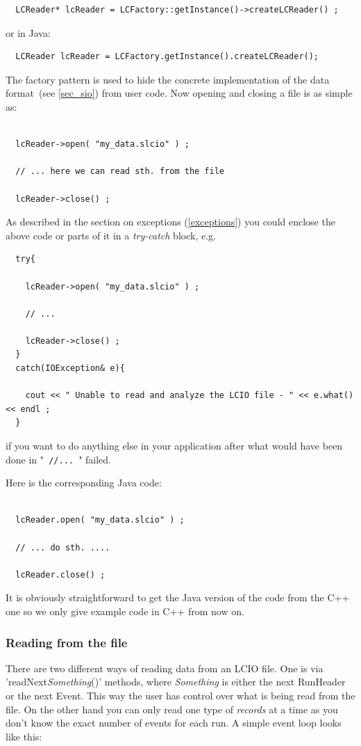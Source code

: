 \documentclass[twoside]{article}
\begin{document}
\begin{verbatim}
  LCReader* lcReader = LCFactory::getInstance()->createLCReader() ;
\end{verbatim}
or in Java:
\begin{verbatim}
  LCReader lcReader = LCFactory.getInstance().createLCReader();
\end{verbatim}

The factory pattern is used to hide  the concrete implementation of the data 
format~(see \ref{sec_sio}) from user code.
Now opening and closing a file is as simple as:
\begin{verbatim}

  lcReader->open( "my_data.slcio" ) ;
    
  // ... here we can read sth. from the file 

  lcReader->close() ;

\end{verbatim}
As described in the section on exceptions (\ref{exceptions}) you could enclose the above code or parts 
of it in a {\em try-catch} block, e.g.

\begin{verbatim}
  try{
    
    lcReader->open( "my_data.slcio" ) ;
    
    // ...

    lcReader->close() ;
  }
  catch(IOException& e){

    cout << " Unable to read and analyze the LCIO file - " << e.what() << endl ;
  }
\end{verbatim}
if you want to do anything else in your application after what would have been done in 
"\verb$ //... $" failed.


Here is the corresponding Java code:
\begin{verbatim}

  lcReader.open( "my_data.slcio" ) ;

  // ... do sth. ....

  lcReader.close() ;

\end{verbatim}
It is obviously straightforward to get the Java version of the code from the C++ one
so we only give example code in C++ from now on.

\subsubsection{Reading from the file}
There are two different ways of reading data from an LCIO file. One is via 
'readNext{\em Something}()' methods, where {\em Something} is either the next RunHeader or the next 
Event. This way the user has control over what is being read from the file. On the other hand you 
can only read one type of {\em records } at a time as you don't know the exact number of events for 
each run. A simple event loop looks like this: 
\end{document}
